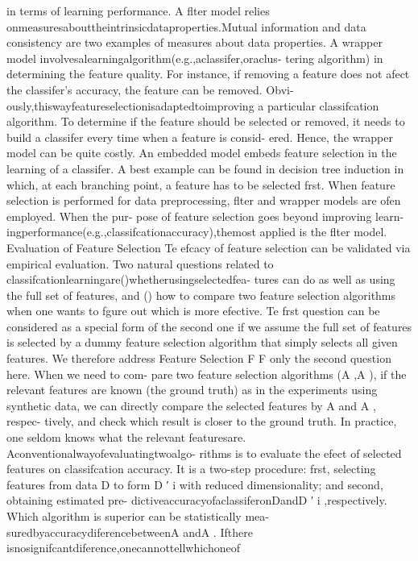 in terms of learning performance. 
A flter model relies
onmeasuresabouttheintrinsicdataproperties.Mutual
information and data consistency are two examples
of measures about data properties. A wrapper model
involvesalearningalgorithm(e.g.,aclassifer,oraclus-
tering algorithm) in determining the feature quality.
For instance, if removing a feature does not afect the
classifer’s accuracy, the feature can be removed. 
Obvi-
ously,thiswayfeatureselectionisadaptedtoimproving
a particular classifcation algorithm. 
To determine if
the feature should be selected or removed, it needs to
build a classifer every time when a feature is consid-
ered. 
Hence, the wrapper model can be quite costly.
An embedded model embeds feature selection in the
learning of a classifer. 
A best example can be found
in decision tree induction in which, at each branching
point, a feature has to be selected frst. When feature
selection is performed for data preprocessing, flter and
wrapper models are ofen employed. When the pur-
pose of feature selection goes beyond improving learn-
ingperformance(e.g.,classifcationaccuracy),themost
applied is the flter model.
Evaluation of Feature Selection
Te efcacy of feature selection can be validated via
empirical evaluation. 
Two natural questions related to
classifcationlearningare()whetherusingselectedfea-
tures can do as well as using the full set of features, and
() how to compare two feature selection algorithms
when one wants to fgure out which is more efective.
Te frst question can be considered as a special form
of the second one if we assume the full set of features
is selected by a dummy feature selection algorithm that
simply selects all given features. 
We therefore address
Feature Selection F 
F
only the second question here. 
When we need to com-
pare two feature selection algorithms (A  ,A  ), if the
relevant features are known (the ground truth) as in
the experiments using synthetic data, we can directly
compare the selected features by A  and A  , respec-
tively, and check which result is closer to the ground
truth. In practice, one seldom knows what the relevant
featuresare.
Aconventionalwayofevaluatingtwoalgo-
rithms is to evaluate the efect of selected features on
classifcation accuracy. 
It is a two-step procedure: frst,
selecting features from data D to form D ′ i with reduced
dimensionality; and second, obtaining estimated pre-
dictiveaccuracyofaclassiferonDandD ′ i ,respectively.
Which algorithm is superior can be statistically mea-
suredbyaccuracydiferencebetweenA  andA  .
Ifthere
isnosignifcantdiference,onecannottellwhichoneof
